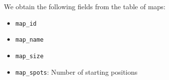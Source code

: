 We obtain the following fields from the table of maps:
\begin{multicols}{2}
\begin{itemize}
  \item \verb$map_id$
  \item \verb$map_name$
  \item \verb$map_size$
  \item \verb$map_spots$: Number of starting positions
\end{itemize}
\end{multicols}


